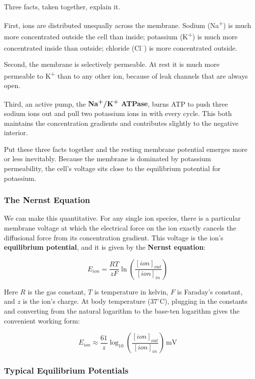 \documentclass[11pt]{article}
\begin{document}
Three facts, taken together, explain it.

First, ions are distributed unequally across the membrane. Sodium (Na\textsuperscript{+}) is much more concentrated outside the cell than inside; potassium (K\textsuperscript{+}) is much more concentrated inside than outside; chloride (Cl\textsuperscript{--}) is more concentrated outside.

Second, the membrane is selectively permeable. At rest it is much more permeable to K\textsuperscript{+} than to any other ion, because of leak channels that are always open.

Third, an active pump, the \textbf{Na\textsuperscript{+}/K\textsuperscript{+} ATPase}, burns ATP to push three sodium ions out and pull two potassium ions in with every cycle. This both maintains the concentration gradients and contributes slightly to the negative interior.

Put these three facts together and the resting membrane potential emerges more or less inevitably. Because the membrane is dominated by potassium permeability, the cell's voltage sits close to the equilibrium potential for potassium.

\subsubsection{The Nernst Equation}

We can make this quantitative. For any single ion species, there is a particular membrane voltage at which the electrical force on the ion exactly cancels the diffusional force from its concentration gradient. This voltage is the ion's \textbf{equilibrium potential}, and it is given by the \textbf{Nernst equation}:

\[
E_{ion} = \frac{RT}{zF} \ln\!\left(\frac{[ion]_{out}}{[ion]_{in}}\right)
\]

Here $R$ is the gas constant, $T$ is temperature in kelvin, $F$ is Faraday's constant, and $z$ is the ion's charge. At body temperature ($37^\circ$C), plugging in the constants and converting from the natural logarithm to the base-ten logarithm gives the convenient working form:

\[
E_{ion} \approx \frac{61}{z} \log_{10}\!\left(\frac{[ion]_{out}}{[ion]_{in}}\right) \, \text{mV}
\]

\subsubsection{Typical Equilibrium Potentials}
\end{document}
